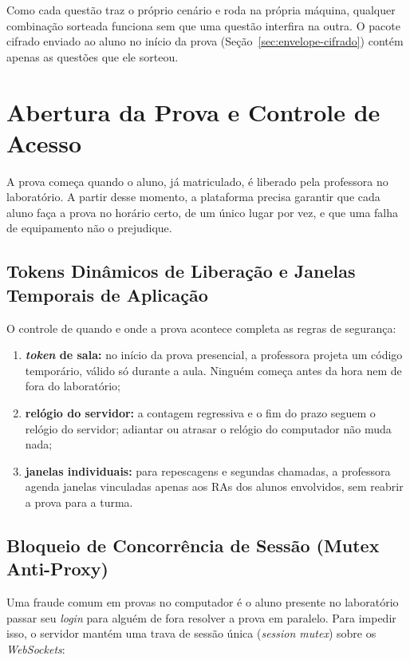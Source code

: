 Como cada questão traz o próprio cenário e roda na própria máquina, qualquer combinação sorteada funciona sem que uma questão interfira na outra. O pacote cifrado enviado ao aluno no início da prova (Seção~\ref{sec:envelope-cifrado}) contém apenas as questões que ele sorteou.

\section{Abertura da Prova e Controle de Acesso}
\label{sec:abertura-prova}

A prova começa quando o aluno, já matriculado, é liberado pela professora no laboratório. A partir desse momento, a plataforma precisa garantir que cada aluno faça a prova no horário certo, de um único lugar por vez, e que uma falha de equipamento não o prejudique.

\subsection{Tokens Dinâmicos de Liberação e Janelas Temporais de Aplicação}
\label{sec:seguranca-prova}

O controle de quando e onde a prova acontece completa as regras de segurança:

\begin{enumerate}
    \item \textbf{\textit{token} de sala:} no início da prova presencial, a professora projeta um código temporário, válido só durante a aula. Ninguém começa antes da hora nem de fora do laboratório;
    \item \textbf{relógio do servidor:} a contagem regressiva e o fim do prazo seguem o relógio do servidor; adiantar ou atrasar o relógio do computador não muda nada;
    \item \textbf{janelas individuais:} para repescagens e segundas chamadas, a professora agenda janelas vinculadas apenas aos RAs dos alunos envolvidos, sem reabrir a prova para a turma.
\end{enumerate}

\subsection{Bloqueio de Concorrência de Sessão (Mutex Anti-Proxy)}
\label{sec:mutex-sessao}

Uma fraude comum em provas no computador é o aluno presente no laboratório passar seu \textit{login} para alguém de fora resolver a prova em paralelo. Para impedir isso, o servidor mantém uma trava de sessão única (\textit{session mutex}) sobre os \textit{WebSockets}:

